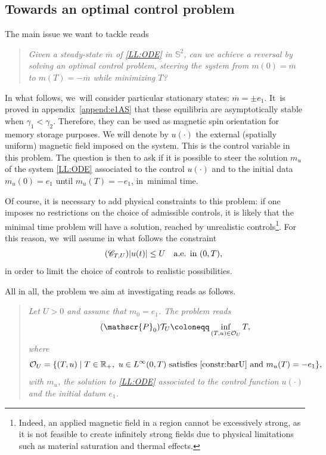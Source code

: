 \documentclass[JEP,XML,SOM,Unicode,NoEqCountersInSection,NoFloatCountersInSection,published]{cedram}
\theoremstyle{definition}
\newcommand{\R} {\mathbb{R}}
\begin{document}
\subsection{Towards an optimal control problem}\label{sec:OCP}

The main issue we want to tackle reads
\begin{quote}
\textit{Given a steady-state $\overline{m}$ of \eqref{LL:ODE} in $\mathbb{S}^2$, can we achieve a reversal by solving an optimal control problem, \ie steering the system from $m(0)=\overline{m}$ to $m(T)=-\overline{m}$ while minimizing $T$?}
\end{quote}
In what follows, we~will consider particular stationary states: $\overline{m}=\pm e_1$. It~is proved in appendix~\ref{append:e1AS} that these equilibria are asymptotically stable when $\gamma_1 < \gamma_2$. Therefore, they can be used as magnetic spin orientation for memory storage purposes.
We will denote by $u(\cdot)$ the external (spatially uniform) magnetic field imposed on the system. This is the control variable in this problem. The question is then to ask if it is possible to steer the solution $m_u$ of the system \eqref{LL:ODE} associated to the control $u(\cdot)$ and to the initial data $m_u(0)=e_1$ until $m_u(T)=-e_1$, in~minimal time.

Of course, it is necessary to add physical constraints to this problem: if one imposes no restrictions on the choice of admissible controls, it is likely that the minimal time problem will have a solution, reached by unrealistic controls\footnote{{Indeed, an applied magnetic field in a region cannot be excessively strong, as it is not feasible to create infinitely strong fields due to physical limitations such as material saturation and thermal effects. }}.
For this reason, we~will assume in what follows the constraint
\begin{equation}\label{constr:barU}\tag{$\mathscr{C}_{T,U }$}
|u(t)|\leq U \quad \text{a.e. in }(0,T),
\end{equation}
in order to limit the choice of controls to realistic possibilities.

All in all, the problem we aim at investigating reads as follows.

\begin{quote}
\textit{Let $U >0$ and assume that $m_0=e_1$. The problem reads
\begin{equation}\label{OCP:minT}\tag{$\mathscr{P}_0$}
\mathcal{T}_{U } \coloneqq \inf_{(T,u)\in \mathcal{O}_{U }}T,
\end{equation}
where
\[
\mathcal{O}_{U }=\{(T,u)\mid T\in \R_+, \ u\in L^\infty(0,T)\text{ satisfies }\eqref{constr:barU}\text{ and }m_u(T)=-e_1\},
\]
with $m_u$, the solution to \eqref{LL:ODE} associated to the control function $u(\cdot)$ and the initial datum $e_1$.}
\end{quote}
\end{document}
